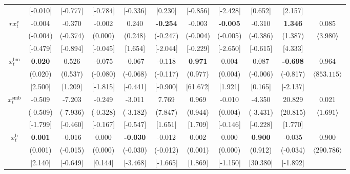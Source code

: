 \documentclass[
  a4paper,
  oneside]{memoir}
\begin{document}
\begin{table}[H]
{\begin{threeparttable}
\begin{tabular}[t]{ccccccccccc}
\rowcolor{gray!6}   & [-0.010] & [-0.777] & [-0.784] & [-0.336] & [0.230] & [-0.856] & [-2.428] & [0.652] & [2.157] & \\
 
$rx_t^{\text{v}}$ & -0.004 & -0.370 & -0.002 & 0.240 & \textbf{-0.254} & -0.003 & \textbf{-0.005} & -0.310 & \textbf{ 1.346} & 0.085\\
 
\rowcolor{gray!6}   & (-0.004) & (-0.374) & (0.000) & (0.248) & (-0.247) & (-0.004) & (-0.005) & (-0.386) & (1.387) & $\langle3.980\rangle$\\
 
 & [-0.479] & [-0.894] & [-0.045] & [1.654] & [-2.044] & [-0.229] & [-2.650] & [-0.615] & [4.333] & \\
 
\rowcolor{gray!6}  $x_t^{\text{bm}}$ & \textbf{ 0.020} & 0.526 & -0.075 & -0.067 & -0.118 & \textbf{ 0.971} & 0.004 & 0.087 & \textbf{-0.698} & 0.964\\
 
 & (0.020) & (0.537) & (-0.080) & (-0.068) & (-0.117) & (0.977) & (0.004) & (-0.006) & (-0.817) & $\langle853.115\rangle$\\
 
\rowcolor{gray!6}   & [2.500] & [1.209] & [-1.815] & [-0.441] & [-0.900] & [61.672] & [1.921] & [0.165] & [-2.137] & \\
 
$x_t^{\text{smb}}$ & -0.509 & -7.203 & -0.249 & -3.011 & 7.769 & 0.969 & -0.010 & -4.350 & 20.829 & 0.021\\
 
\rowcolor{gray!6}   & (-0.509) & (-7.936) & (-0.328) & (-3.182) & (7.847) & (0.944) & (0.004) & (-3.431) & (20.815) & $\langle1.691\rangle$\\
 
 & [-1.799] & [-0.460] & [-0.167] & [-0.547] & [1.651] & [1.709] & [-0.146] & [-0.228] & [1.770] & \\
 
\rowcolor{gray!6}  $x_t^{\text{b}}$ & \textbf{ 0.001} & -0.016 & 0.000 & \textbf{-0.030} & -0.012 & 0.002 & 0.000 & \textbf{ 0.900} & -0.035 & 0.900\\
 
 & (0.001) & (-0.015) & (0.000) & (-0.030) & (-0.012) & (0.001) & (0.000) & (0.912) & (-0.034) & $\langle290.786\rangle$\\
 
\rowcolor{gray!6}   & [2.140] & [-0.649] & [0.144] & [-3.468] & [-1.665] & [1.869] & [-1.150] & [30.380] & [-1.892] & \\
 

\end{tabular}
\end{threeparttable}}
\end{table}
\end{document}
